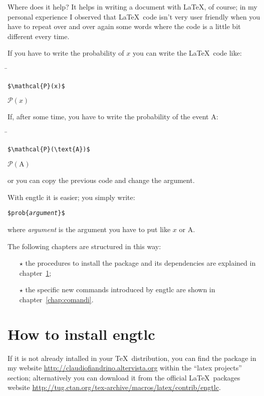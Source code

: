 \documentclass[11pt,a4paper,openany]{book}
\newcommand*{\meta}[1]{{\normalfont\textlangle\textit{#1}\textrangle}}
\newcommand*{\marg}[1]{\texttt{\{\meta{#1}\}}}
\newcommand*{\cs}[1]{\texttt{\char92#1}}
\begin{document}
Where does it help?
It helps in writing a document with \LaTeX, of course; in my personal experience I observed that \LaTeX\ code isn't very user friendly when you have to repeat over and over again some words where the code is a little bit different every time.

If you have to write the probability of $x$ you can write the \LaTeX\ code like:
\begin{tabbing}
\hspace{7cm}\=\kill
\begin{lstlisting}
$\mathcal{P}(x)$
\end{lstlisting}  \>   $\mathcal{P}(x)$
\end{tabbing} 
If, after some time, you have to write the probability of the event A:
\begin{tabbing}
\hspace{7cm}\=\kill
\begin{lstlisting}
$\mathcal{P}(\text{A})$ 
\end{lstlisting} \>   $\mathcal{P}(\text{A})$
\end{tabbing} 
or you can copy the previous code and change the argument.

With \textsf{engtlc} it is easier; you simply write:
\begin{flushleft}
\texttt{\$\cs{prob}\marg{argument}\$}
\end{flushleft}
where \meta{argument} is the argument you have to put like $x$ or A.

The following chapters are structured in this way:
\begin{itemize}
\item[$\star$] the procedures to install the package and its dependencies are explained in chapter~\ref{chap:installazione};
\item[$\star$] the specific new commands introduced by \textsf{engtlc} are shown in chapter~\ref{chap:comandi}.
\end{itemize}


\chapter{How to install \textsf{engtlc}}
\label{chap:installazione}
If it is not already intalled in your \TeX\ distribution, you can find the package in my website \url{http://claudiofiandrino.altervista.org} within the ``latex projects'' section; alternatively you can download it from the official \LaTeX\ packages website \url{http://tug.ctan.org/tex-archive/macros/latex/contrib/engtlc}.
\end{document}
